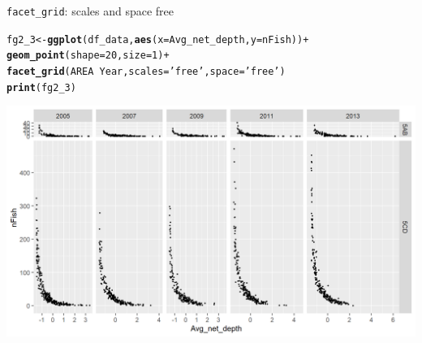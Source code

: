 \documentclass{beamer}\usepackage[]{graphicx}\usepackage[]{color}
\makeatletter
\newcommand{\hlnum}[1]{\textcolor[rgb]{0.686,0.059,0.569}{#1}}%
\newcommand{\hlstr}[1]{\textcolor[rgb]{0.192,0.494,0.8}{#1}}%
\newcommand{\hlopt}[1]{\textcolor[rgb]{0,0,0}{#1}}%
\newcommand{\hlstd}[1]{\textcolor[rgb]{0.345,0.345,0.345}{#1}}%
\newcommand{\hlkwb}[1]{\textcolor[rgb]{0.69,0.353,0.396}{#1}}%
\newcommand{\hlkwc}[1]{\textcolor[rgb]{0.333,0.667,0.333}{#1}}%
\newcommand{\hlkwd}[1]{\textcolor[rgb]{0.737,0.353,0.396}{\textbf{#1}}}%
\newenvironment{kframe}{%
 \def\at@end@of@kframe{}%
 \ifinner\ifhmode%
  \def\at@end@of@kframe{\end{minipage}}%
  \begin{minipage}{\columnwidth}%
 \fi\fi%
 \def\FrameCommand##1{\hskip\@totalleftmargin \hskip-\fboxsep
 \colorbox{shadecolor}{##1}\hskip-\fboxsep
     \hskip-\linewidth \hskip-\@totalleftmargin \hskip\columnwidth}%
 \MakeFramed {\advance\hsize-\width
   \@totalleftmargin\z@ \linewidth\hsize
   \@setminipage}}%
 {\par\unskip\endMakeFramed%
 \at@end@of@kframe}
\newenvironment{knitrout}{}{} %
\makeatother
\begin{document}
\begin{frame}[fragile]{\lstinline{facet_grid}: scales and space free}
\begin{knitrout}\footnotesize
{}\color{fgcolor}\begin{kframe}
\begin{alltt}
\hlstd{fg2_3} \hlkwb{<-} \hlkwd{ggplot}\hlstd{(df_data,} \hlkwd{aes}\hlstd{(}\hlkwc{x}\hlstd{=Avg_net_depth,} \hlkwc{y}\hlstd{=nFish))} \hlopt{+}
  \hlkwd{geom_point}\hlstd{(}\hlkwc{shape}\hlstd{=}\hlnum{20}\hlstd{,} \hlkwc{size}\hlstd{=}\hlnum{1}\hlstd{)} \hlopt{+}
  \hlkwd{facet_grid}\hlstd{(AREA} \hlopt{~} \hlstd{Year,} \hlkwc{scales}\hlstd{=}\hlstr{'free'}\hlstd{,} \hlkwc{space} \hlstd{=} \hlstr{'free'}\hlstd{)}
\hlkwd{print}\hlstd{(fg2_3)}
\end{alltt}
\end{kframe}

{\centering \includegraphics[width=.9\linewidth]{figure/facet_grid_6-1} 

}



\end{knitrout}
\end{frame}
\end{document}
